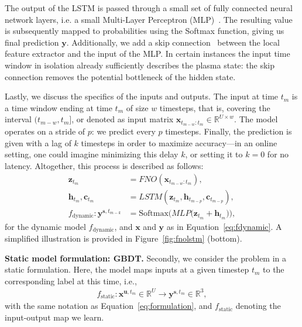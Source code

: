 The output of the LSTM is passed through a small set of fully connected neural network layers, i.e. a small Multi-Layer Perceptron (MLP)~\cite{ivakhnenko1971}. The resulting value is subsequently mapped to probabilities using the Softmax function, giving us final prediction $\mathbf{y}$. Additionally, we add a skip connection~\cite{he2016} between the local feature extractor and the input of the MLP. In certain instances the input time window in isolation already sufficiently describes the plasma state: the skip connection removes the potential bottleneck of the hidden state.

Lastly, we discuss the specifics of the inputs and outputs. The input at time $t_m$ is a time window ending at time $t_m$ of size $w$ timesteps, that is, covering the interval $(t_{m-w}, t_m]$, or denoted as input matrix $\mathbf{x}_{t_{m-w}:t_m} \in \mathbb{R}^{U \times w}$. The model operates on a stride of $p$: we predict every $p$ timesteps. Finally, the prediction is given with a lag of $k$ timesteps in order to maximize accuracy---in an online setting, one could imagine minimizing this delay $k$, or setting it to $k=0$ for no latency. Altogether, this process is described as follows:
\begin{align}
\mathbf{z}_{t_m} &= \textit{FNO}(\mathbf{x}_{t_{m-w}:t_m}), \\
\mathbf{h}_{t_m}, \mathbf{c}_{t_m} &= \textit{LSTM}(\mathbf{z}_{t_m}, \mathbf{h}_{t_{m-p}}, \mathbf{c}_{t_{m-p}}),\\
f_{\text{dynamic}} : \mathbf{y}^{\mathbf{s},t_{m-k}} &= \text{Softmax}\big(\textit{MLP} \big(\mathbf{z}_{t_m} + \mathbf{h}_{t_m}\big)\big),
\label{eq:fdynamic_fnolstm}
\end{align}
for the dynamic model $f_{\text{dynamic}}$, and $\mathbf{x}$ and $\mathbf{y}$ as in Equation~\ref{eq:fdynamic}. A simplified illustration is provided in Figure~\ref{fig:fnolstm} (bottom).

\textbf{Static model formulation: GBDT.}
Secondly, we consider the problem in a static formulation. Here, the model maps inputs at a given timestep $t_m$ to the corresponding label at this time, i.e.,
\begin{align}
f_{\text{static}}: \mathbf{x}^{\mathbf{u},t_m} \in \mathbb{R}^{\textit{U}}\rightarrow \mathbf{y}^{\mathbf{s},t_m}\in \mathbb{R}^{3},
\label{eq:fstatic}
\end{align}
with the same notation as Equation~\ref{eq:formulation}, and $f_{\text{static}}$ denoting the input-output map we learn.

